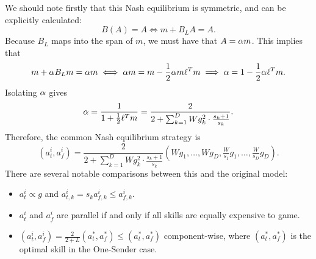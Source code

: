 We should note firstly that this Nash equilibrium is symmetric, and can be explicitly calculated: $$B(A)=A \iff m+B_LA=A.$$ Because $B_L$ maps into the span of $m$, we must have that $A=\alpha m$. This implies that $$m+\alpha B_Lm=\alpha m \iff \alpha m=m-\dfrac 1 2 \alpha m\ell^Tm \implies \alpha = 1-\dfrac 1 2 \alpha\ell^Tm.$$ Isolating $\alpha$ gives $$\alpha=\dfrac 1{1+\tfrac 1 2 \ell^T m}=\dfrac{2}{2+\sum_{k=1}^D Wg_k^2 \cdot \tfrac{s_k+1}{s_k}}.$$ Therefore, the common Nash equilibrium strategy is $$(a_t^i,a_f^i)=\dfrac{2}{2+\sum_{k=1}^D Wg_k^2 \cdot \tfrac{s_k+1}{s_k}} (Wg_1,\dots,Wg_D,\tfrac W{s_1}g_1,\dots,\tfrac W{s_D}g_D).$$ There are several notable comparisons between this and the original model:
\begin{itemize}[nosep]
    \item $a_{t}^i \propto g$ and $a_{t,k}^i =s_k a^i_{f,k}\leq a_{f,k}^i$.
    \item $a_t^i$ and $a_f^i$ are parallel if and only if all skills are equally expensive to game.
    \item $(a_t^i,a_f^i)=\tfrac{2}{2+L}(a_t^*,a_f^*)\leq (a_t^*,a_f^*)$ component-wise, where $(a_t^*,a_f^*)$ is the optimal skill in the One-Sender case.
\end{itemize}
